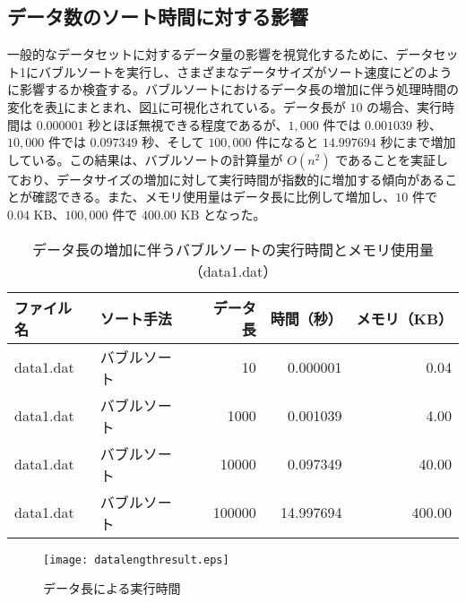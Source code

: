 \documentclass[a4j, 12pt]{jarticle}
\begin{document}
\subsection{データ数のソート時間に対する影響}
一般的なデータセットに対するデータ量の影響を視覚化するために、データセット1にバブルソートを実行し、さまざまなデータサイズがソート速度にどのように影響するか検査する。バブルソートにおけるデータ長の増加に伴う処理時間の変化を表\ref{bubblesortscaling}にまとまれ、図\ref{datalengthresultgraph}に可視化されている。データ長が $10$ の場合、実行時間は $0.000001$ 秒とほぼ無視できる程度であるが、$1,000$ 件では $0.001039$ 秒、$10,000$ 件では $0.097349$ 秒、そして $100,000$ 件になると $14.997694$ 秒にまで増加している。この結果は、バブルソートの計算量が $O(n^2)$ であることを実証しており、データサイズの増加に対して実行時間が指数的に増加する傾向があることが確認できる。また、メモリ使用量はデータ長に比例して増加し、$10$ 件で $0.04$ KB、$100,000$ 件で $400.00$ KB となった。
\begin{table}[H]
  \centering
  \caption{データ長の増加に伴うバブルソートの実行時間とメモリ使用量（data1.dat）}\label{bubblesortscaling}
  \begin{tabular}{|l|l|r|r|r|}
    \hline
    \textbf{ファイル名} & \textbf{ソート手法} & \textbf{データ長} & \textbf{時間（秒）} & \textbf{メモリ（KB）} \\
    \hline
    data1.dat & バブルソート & 10      & 0.000001  & 0.04   \\
    data1.dat & バブルソート & 1000    & 0.001039  & 4.00   \\
    data1.dat & バブルソート & 10000   & 0.097349  & 40.00  \\
    data1.dat & バブルソート & 100000  & 14.997694 & 400.00 \\
    \hline
  \end{tabular}
\end{table}
\begin{figure}[H]
  \centering
  \texttt{[image: datalengthresult.eps]}
  \caption{データ長による実行時間}\label{datalengthresultgraph}
\end{figure}
\end{document}
